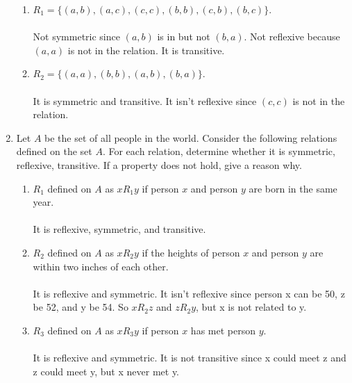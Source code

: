 \documentclass[12pt]{article}
\begin{document}
\begin{enumerate}
\begin{enumerate}
\item $R_1 = \{(a,b), (a,c), (c,c), (b,b), (c,b), (b,c)\}$.\\\\
Not symmetric since $(a,b)$ is in but not $(b,a)$. Not reflexive because $(a,a)$ is not in the relation. It is transitive.\\
\item $R_2 = \{(a,a), (b,b), (a,b), (b,a)\}$.\\\\
It is symmetric and transitive. It isn't reflexive since $(c,c)$ is not in the relation.
\end{enumerate} 


\medskip

\item Let $A$ be the set of all people in the world. Consider the following relations defined on the set $A$. For each relation, determine whether it is symmetric, reflexive, transitive.  If a property does not hold, give a reason why.

\begin{enumerate}
\item $R_1$ defined on $A$ as $x R_1 y$ if person $x$ and person $y$ are born in the same year.\\\\
It is reflexive, symmetric, and transitive.\\
\item $R_2$ defined on $A$ as $x R_2 y$ if the heights of person $x$ and person $y$ are within two inches of each other.\\\\
It is reflexive and symmetric. It isn't reflexive since person x can be 50, z be 52, and y be 54. So $x R_2 z$ and $z R_2 y$, but x is not related to y.\\
\item $R_3$ defined on $A$ as $x R_3 y$ if person $x$ has met person $y$.\\\\
It is reflexive and symmetric. It is not transitive since x could meet z and z could meet y, but x never met y.
\end{enumerate}

\medskip


\end{enumerate}
\end{document}
